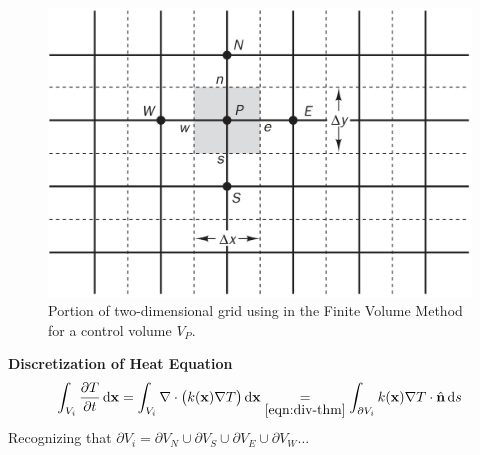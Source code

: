 \documentclass[final]{beamer}
\begin{document}
\begin{frame}
	\begin{figure}
		\includegraphics[width=0.8\linewidth]{FVM-grid.png}
		\caption{Portion of two-dimensional grid using in the Finite Volume Method for a control volume $V_P$. \cite[p. 129]{Versteeg2007}}
	\end{figure}
\end{frame}

\begin{frame}[t]{\bf Discretization of Heat Equation}
	\begin{equation*}
		\int_{V_i}\frac{\partial T}{\partial t}\dif\mathbf{x}=\int_{V_i}\nabla\cdot \left(k(\mathbf{x})\nabla T\right)\dif\mathbf{x}\underset{\eqref{eqn:div-thm}}{=}\int_{\partial V_i}k(\mathbf{x})\nabla T\cdot\hat{\mathbf{n}}\dif s
	\end{equation*}
\vfill
\pause
Recognizing that $\partial V_i=\partial V_N\cup\partial V_S\cup\partial V_E\cup\partial V_W\ldots$
\vfill
\pause
	\hspace*{-2pt}
\vfill
\end{frame}
\end{document}
